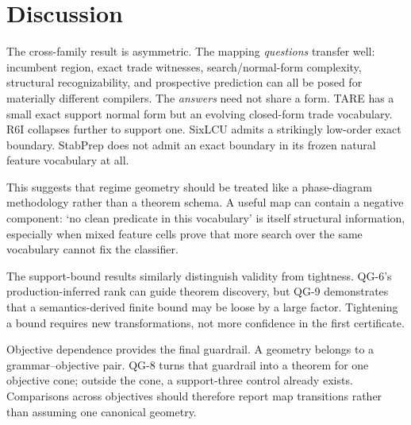 \section{Discussion}

The cross-family result is asymmetric. The mapping \emph{questions} transfer well: incumbent region, exact trade witnesses, search/normal-form complexity, structural recognizability, and prospective prediction can all be posed for materially different compilers. The \emph{answers} need not share a form. TARE has a small exact support normal form but an evolving closed-form trade vocabulary. R6I collapses further to support one. SixLCU admits a strikingly low-order exact boundary. StabPrep does not admit an exact boundary in its frozen natural feature vocabulary at all.

This suggests that regime geometry should be treated like a phase-diagram methodology rather than a theorem schema. A useful map can contain a negative component: `no clean predicate in this vocabulary' is itself structural information, especially when mixed feature cells prove that more search over the same vocabulary cannot fix the classifier.

The support-bound results similarly distinguish validity from tightness. QG-6's production-inferred rank can guide theorem discovery, but QG-9 demonstrates that a semantics-derived finite bound may be loose by a large factor. Tightening a bound requires new transformations, not more confidence in the first certificate.

Objective dependence provides the final guardrail. A geometry belongs to a grammar--objective pair. QG-8 turns that guardrail into a theorem for one objective cone; outside the cone, a support-three control already exists. Comparisons across objectives should therefore report map transitions rather than assuming one canonical geometry.